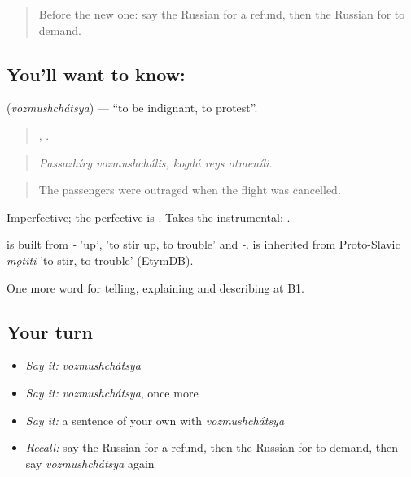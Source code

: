 \label{lesson:RU-C436-vozmushchatsya}



\begin{quote}
Before the new one: say the Russian for a refund, then the Russian for to demand.
\end{quote}

\subsection*{You'll want to know: }
\textbf{} (\emph{vozmushchátsya}) — \textquotedblleft{}to be indignant, to protest\textquotedblright{}.

\begin{quote}
 ,   .
\end{quote}

\begin{quote}
\emph{Passazhíry vozmushchális, kogdá reys otmeníli.}
\end{quote}

\begin{quote}
The passengers were outraged when the flight was cancelled.
\end{quote}

Imperfective; the perfective is \emph{}. Takes the instrumental: \emph{ }.

\begin{cousinweb}
\emph{} is built from \emph{-} 'up', \emph{} 'to stir up, to trouble' and \emph{-}. \emph{} is inherited from Proto-Slavic \emph{mǫtiti} 'to stir, to trouble' (EtymDB).
\end{cousinweb}

\begin{grammarlens}[title={What you've built}]
One more word for telling, explaining and describing at B1.
\end{grammarlens}

\subsection*{Your turn}
\begin{itemize}
\raggedright
  \item \emph{Say it:} \emph{vozmushchátsya}
  \item \emph{Say it:} \emph{vozmushchátsya}, once more
  \item \emph{Say it:} a sentence of your own with \emph{vozmushchátsya}
  \item \emph{Recall:} say the Russian for a refund, then the Russian for to demand, then say \emph{vozmushchátsya} again
\end{itemize}

